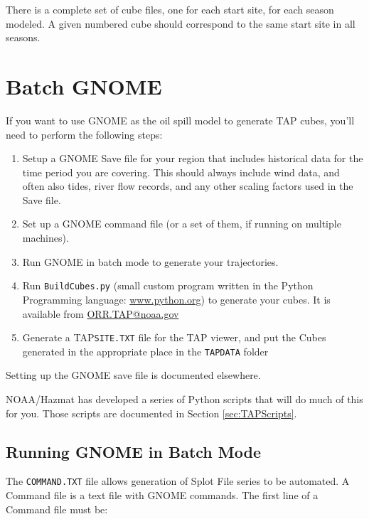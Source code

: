 \documentclass[12pt]{article}      %
\newcommand{\tap}{\textsf{TAP}\xspace}
\newcommand{\gnome}{\textsf{GNOME}\xspace}
\newcommand{\filename}[1]{\texttt{#1}}
\begin{document}
There is a complete set of cube files, one for each start site, for each 
season modeled. A given numbered cube should correspond to the same 
start site in all seasons.

\section{Batch \gnome}

If you want to use \gnome as the oil spill model to generate \tap cubes,
you'll need to perform the following steps:

\begin{enumerate}
\item Setup a \gnome Save file for your region that includes historical
  data for the time period you are covering. This should always include
  wind data, and often also tides, river flow records, and any other
  scaling factors used in the Save file.
  
\item Set up a \gnome command file (or a set of them, if running on
  multiple machines).
  
\item Run \gnome in batch mode to generate your trajectories.
  
\item Run \filename{BuildCubes.py} (small custom program written in the
  Python Programming language: \url{www.python.org}) to generate your
  cubes. It is available from \url{ORR.TAP@noaa.gov}
  
\item Generate a \tap \filename{SITE.TXT} file for the \tap viewer, and
  put the Cubes generated in the appropriate place in the
  \filename{TAPDATA} folder
\end{enumerate}
Setting up the \gnome save file is documented elsewhere.

NOAA/Hazmat has developed a series of Python scripts that will do much
of this for you. Those scripts are documented in Section \ref{sec:TAPScripts}.



\subsection{Running \gnome in Batch Mode}

The \filename{COMMAND.TXT} file allows generation of Splot File series
to be automated. A Command file is a text file with \gnome commands.
The first line of a Command file must be: 
\end{document}
